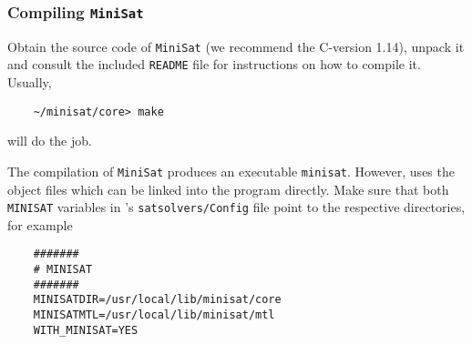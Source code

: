 \subsubsection{Compiling \texttt{MiniSat}}

Obtain the source code of \texttt{MiniSat} (we recommend the C-version 1.14), unpack it and
consult the included \texttt{README} file for instructions on how to compile it. Usually,
\begin{verbatim}
    ~/minisat/core> make
\end{verbatim}
will do the job.

The compilation of \texttt{MiniSat} produces an executable \texttt{minisat}. However, \pgsolver uses the
object files which can be linked into the program directly. Make sure that both
\verb#MINISAT# variables in \pgsolver's \texttt{satsolvers/Config} file point to the respective directories, for example
\begin{verbatim}
    #######
    # MINISAT
    #######
    MINISATDIR=/usr/local/lib/minisat/core
    MINISATMTL=/usr/local/lib/minisat/mtl
    WITH_MINISAT=YES
\end{verbatim}



